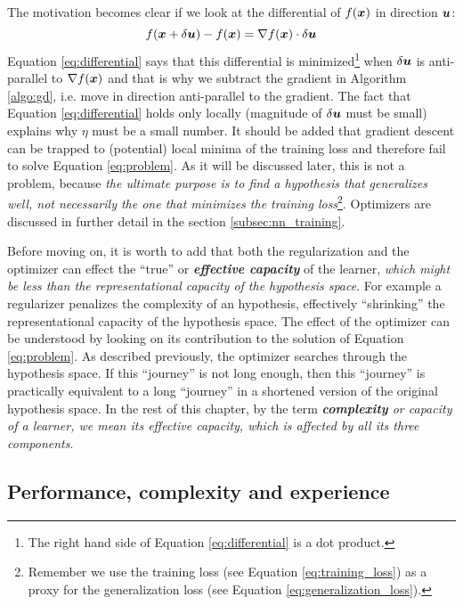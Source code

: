 The motivation becomes clear if we look at the differential of $f(\boldsymbol{x})$ in
direction $\boldsymbol{u}$:
\begin{equation}
	\label{eq:differential}
	f(\boldsymbol{x} + \delta \boldsymbol{u}) - f(\boldsymbol{x}) = \nabla f(\boldsymbol{x}) \cdot \delta \boldsymbol{u}
\end{equation}
Equation \ref{eq:differential} says that this differential is
minimized\footnote{The right hand side of Equation \ref{eq:differential} is a
dot product.} when $\delta \boldsymbol{u}$ is anti-parallel to $\nabla f(\boldsymbol{x})$ and that
is why we subtract the gradient in Algorithm \ref{algo:gd}, i.e. move in
direction anti-parallel to the gradient. The fact that Equation
\ref{eq:differential} holds only locally (magnitude of $\delta \boldsymbol{u}$ must be
small) explains why $\eta$ must be a small number. It should be added that
gradient descent can be trapped to (potential) local minima of the training loss
and therefore fail to solve Equation \ref{eq:problem}. As it will be discussed
later, this is not a problem, because \emph{the ultimate purpose is to find a
hypothesis that generalizes well, not necessarily the one that minimizes the
training loss}\footnote{Remember we use the training loss (see Equation
\ref{eq:training_loss}) as a proxy for the generalization loss (see Equation
\ref{eq:generalization_loss}).}. Optimizers are discussed in further detail in
the section \ref{subsec:nn_training}.

Before moving on, it is worth to add that both the regularization and the
optimizer can effect the ``true'' or \emph{\textbf{effective
capacity}} \parencite{deeplearning} of the learner,
\emph{which might be less than the representational
capacity of the hypothesis space}. For example
a regularizer penalizes the complexity of an hypothesis, effectively
``shrinking'' the representational capacity of the hypothesis space. The effect
of the optimizer can be understood by looking on its contribution to the
solution of Equation \ref{eq:problem}. As described previously, the optimizer
searches through the hypothesis space. If this ``journey'' is not long enough,
then this ``journey'' is practically equivalent to a long ``journey'' in a
shortened version of the original hypothesis space. In the rest of this chapter,
by the term \emph{\textbf{complexity} or
capacity of a learner, we mean its effective capacity, which is
affected by all its three components}.

\subsection{Performance, complexity and experience}

